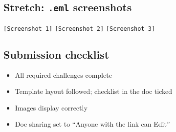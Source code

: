 \documentclass[11pt]{article}
\begin{document}
\subsection*{Stretch: \texttt{.eml} screenshots}
\texttt{[Screenshot 1]} \quad \texttt{[Screenshot 2]} \quad \texttt{[Screenshot 3]}

\subsection*{Submission checklist}
\begin{itemize}[label=$\square$]
  \item All required challenges complete
  \item Template layout followed; checklist in the doc ticked
  \item Images display correctly
  \item Doc sharing set to ``Anyone with the link can Edit''
\end{itemize}
\end{document}
